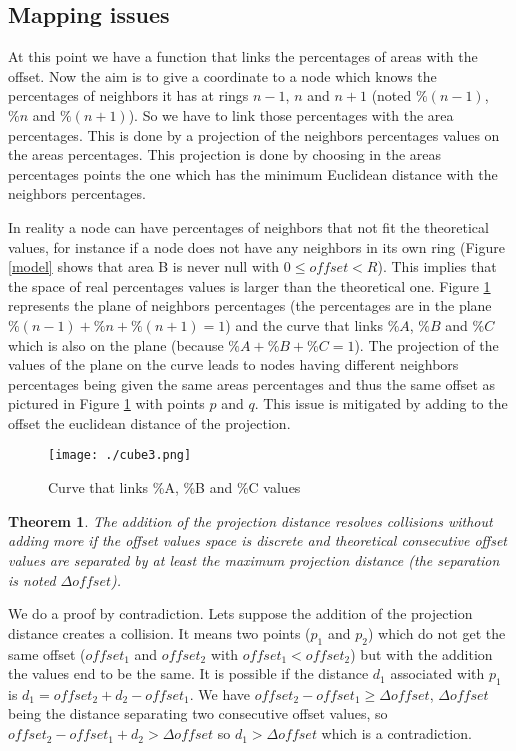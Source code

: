 \documentclass[a4paper]{article}
\newtheorem{theorem}{Theorem}[section]
\newenvironment{proof}[1][Proof]{\begin{trivlist}
\item[\hskip \labelsep {\bfseries #1}]}{\end{trivlist}}
\begin{document}
\subsection{Mapping issues}

At this point we have a function that links the percentages of areas with the offset. Now the aim is to give a coordinate to a node which knows the percentages of neighbors it has at rings $n-1$, $n$ and $n+1$ (noted $\%(n-1)$, $\%n$ and $\%(n+1)$). So we have to link those percentages with the area percentages. This is done by a projection of the neighbors percentages values on the areas percentages. This projection is done by choosing in the areas percentages points the one which has the minimum Euclidean distance with the neighbors percentages.

In reality a node can have percentages of neighbors that not fit the theoretical values, for instance if a node does not have any neighbors in its own ring (Figure \ref{model} shows that area B is never null with $0\leq offset < R$). This implies that the space of real percentages values is larger than the theoretical one. Figure \ref{cube} represents the plane of neighbors percentages (the percentages are in the plane $\%(n-1)+\%n+\%(n+1)=1$) and the curve that links $\%A$, $\%B$ and $\%C$ which is also on the plane (because $\%A+\%B+\%C=1$). The projection of the values of the plane on the curve leads to nodes having different neighbors percentages being given the same areas percentages and thus the same offset as pictured in Figure \ref{cube} with points $p$ and $q$. This issue is mitigated by adding to the offset the euclidean distance of the projection.


\begin{figure}[!h]
  \centering
  \texttt{[image: ./cube3.png]}
  \caption{Curve that links \%A, \%B and \%C values}
  \label{cube}
\end{figure}

\begin{theorem}
The addition of the projection distance resolves collisions without adding more if the offset values space is discrete and theoretical consecutive offset values are separated by at least the maximum projection distance (the separation is noted $\Delta offset$). 
\end{theorem}
\begin{proof}
 We do a proof by contradiction. Lets suppose the addition of the projection distance creates a collision. It means two points ($p_{1}$ and $p_{2}$) which do not get the same offset ($offset_{1}$ and $offset_{2}$ with $offset_{1}<offset_{2}$) but with the addition the values end to be the same. It is possible if the distance $d_{1}$ associated with $p_{1}$ is $d_{1}=offset_{2}+d_{2}-offset_{1}$. We have $offset_{2}-offset_{1} \geq \Delta offset$, $\Delta offset$ being the distance separating two consecutive offset values, so $offset_{2}-offset_{1}+d_{2}>\Delta offset$ so $d_{1}>\Delta offset$ which is a contradiction.
\end{proof}
\end{document}
